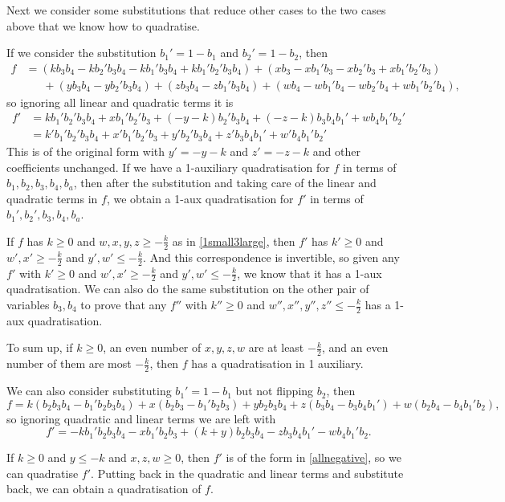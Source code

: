 \documentclass[11pt]{scrartcl}
\begin{document}
Next we consider some substitutions that reduce other cases to the two cases above that we know how to quadratise.

If we consider the substitution $b_1' = 1-b_1$ and $b_2' = 1-b_2$, then
\begin{align*} 
	f &= (kb_3b_4 - kb_2'b_3b_4 -kb_1'b_3b_4 + kb_1'b_2'b_3b_4) + (xb_3 - xb_1'b_3 - xb_2'b_3 +  xb_1'b_2'b_3)  \\ 
	&\phantom{=}\ + (yb_3b_4 - yb_2'b_3b_4) + (zb_3b_4 - zb_1'b_3b_4) + (wb_4 - wb_1'b_4 - wb_2'b_4 + wb_1'b_2'b_4),\end{align*}
so ignoring all linear and quadratic terms it is
\begin{align*} f' &= kb_1'b_2'b_3b_4 + xb_1'b_2'b_3 + (-y-k)b_2'b_3b_4 + (-z-k)b_3b_4b_1' + wb_4b_1'b_2'\\ 
	&=k'b_1'b_2'b_3b_4 + x'b_1'b_2'b_3 + y'b_2'b_3b_4 + z'b_3b_4b_1' + w'b_4b_1'b_2'
\end{align*}
This is of the original form with $y'=-y-k$ and $z'=-z-k$ and other coefficients unchanged. 
If we have a 1-auxiliary quadratisation for $f$ in terms of $b_1, b_2, b_3, b_4, b_a$, 
then after the substitution and taking care of the linear and quadratic terms in $f$, we obtain a 1-aux quadratisation for $f'$ in terms of $b_1', b_2', b_3, b_4, b_a$.

If $f$ has $k \ge 0$ and $w, x, y , z \ge -\frac{k}{2}$ as in \ref{1small3large}, then $f'$ has $k' \ge 0$ and $w', x' \ge -\frac{k}{2}$ and $y', w' \le -\frac{k}{2}$. And this correspondence is invertible, so given any $f'$ with  $k' \ge 0$ and $w', x' \ge -\frac{k}{2}$ and $y', w' \le -\frac{k}{2}$,
we know that it has a 1-aux quadratisation. We can also do the same substitution on the other pair of variables $b_3, b_4$ to prove that any $f''$ with $k'' \ge 0$ and $w'', x'', y'', z'' \le -\frac{k}{2}$ has a 1-aux quadratisation. 

To sum up, if $k\ge 0$, an even number of $x, y, z, w$ are at least $-\frac{k}{2}$, and an even number of them are most $-\frac{k}{2}$, then $f$ has a quadratisation in 1 auxiliary.

We can also consider substituting $b_1' = 1-b_1$ but not flipping $b_2$, then 
\[ f = k(b_2b_3b_4 - b_1'b_2b_3b_4) + x(b_2b_3 - b_1'b_2b_3) + yb_2 b_3 b_4 + z (b_3b_4 - b_3b_4b_1') + w(b_2b_4 - b_4b_1'b_2), \]
so ignoring quadratic and linear terms we are left with 
\[ f' = -k b_1'b_2b_3b_4 -xb_1'b_2b_3 + (k+y)b_2b_3b_4 -zb_3b_4b_1' -w b_4 b_1' b_2 .\]

If $k \ge 0$ and $y \le -k$ and $x, z, w \ge 0$, then $f'$ is of the form in \ref{allnegative}, so we can quadratise $f'$. Putting back in the quadratic and linear terms and substitute back, we can obtain a quadratisation of $f$.
 
\end{document}

